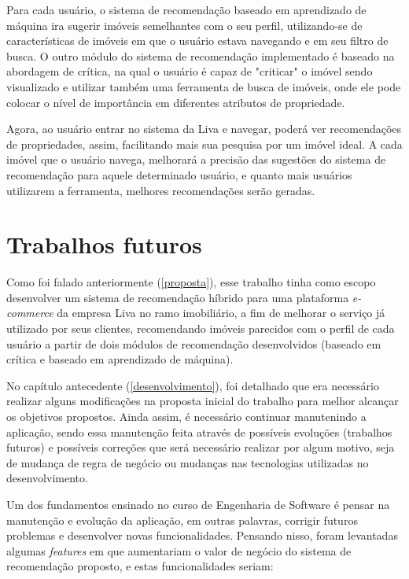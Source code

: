 Para cada usuário, o sistema de recomendação baseado em aprendizado de máquina ira sugerir imóveis semelhantes com o seu perfil, utilizando-se de características de imóveis em que o usuário estava navegando e em seu filtro de busca. O outro módulo do sistema de recomendação implementado é baseado na abordagem de crítica, na qual o usuário é capaz de "criticar" o imóvel sendo visualizado e utilizar também uma ferramenta de busca de imóveis, onde ele pode colocar o nível de importância em diferentes atributos de propriedade.

Agora, ao usuário entrar no sistema da Liva e navegar, poderá ver recomendações de propriedades, assim, facilitando mais sua pesquisa por um imóvel ideal. A cada imóvel que o usuário navega, melhorará a precisão das sugestões do sistema de recomendação para aquele determinado usuário, e quanto mais usuários utilizarem a ferramenta, melhores recomendações serão geradas.

\section{Trabalhos futuros}

Como foi falado anteriormente (\ref{proposta}), esse trabalho tinha como escopo desenvolver um sistema de recomendação híbrido para uma plataforma \textit{e-commerce} da empresa Liva no ramo imobiliário, a fim de melhorar o serviço já utilizado por seus clientes, recomendando imóveis parecidos com o perfil de cada usuário a partir de dois módulos de recomendação desenvolvidos (baseado em crítica e baseado em aprendizado de máquina).

No capítulo antecedente (\ref{desenvolvimento}), foi detalhado que era necessário realizar alguns modificações na proposta inicial do trabalho para melhor alcançar os objetivos propostos. Ainda assim, é necessário continuar manutenindo a aplicação, sendo essa manutenção feita através de possíveis evoluções (trabalhos futuros) e possíveis correções que será necessário realizar por algum motivo, seja de mudança de regra de negócio ou mudanças nas tecnologias utilizadas no desenvolvimento.

Um dos fundamentos ensinado no curso de Engenharia de Software é pensar na manutenção e evolução da aplicação, em outras palavras, corrigir futuros problemas e desenvolver novas funcionalidades. Pensando nisso, foram levantadas algumas \textit{features} em que aumentariam o valor de negócio do sistema de recomendação proposto, e estas funcionalidades seriam:

